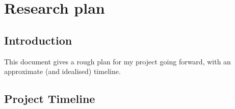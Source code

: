 



% 


\chapter{Research plan}

\section{Introduction}

This document gives a rough plan for my project going forward, with an approximate (and idealised) timeline.

\section{Project Timeline}

